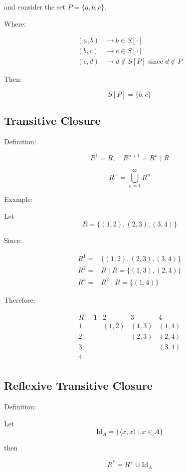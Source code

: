\documentclass[12pt,a4paper,openany]{article}
\begin{document}
and consider the set $P = \{a,b,c\}$.

Where:

$$\begin{aligned}
   (a,b) &\to b \in S[\cdot]\\
    (b,c) &\to c \in S[\cdot]\\
    (c,d) &\to d \notin S[P] \text{ since } d \notin P
\end{aligned}
$$  

Then:

$$
S[P] = \{b,c\}
$$

\subsection{Transitive Closure}

Definition:

$$
R^1 = R, \quad R^{n+1} = R^n \mid R
$$

$$
R^+ = \displaystyle\bigcup_{n=1}^{\infty} R^n
$$

Example:

Let $$R = \{ (1,2), (2,3), (3,4) \}$$ 

Since:

$$\begin{aligned}
R^1 =& \{ (1,2), (2,3), (3,4) \} \\
R^2 =& R \mid R = \{ (1,3), (2,4) \} \\
R^3 =& R^2 \mid R = \{ (1,4) \}
\end{aligned}$$

Therefore:

$$
\begin{array}{c|cccc}
R^+ & 1 & 2 & 3 & 4 \\
\hline
1 & & (1,2) & (1,3) & (1,4) \\
2 & & & (2,3) & (2,4) \\
3 & & & & (3,4) \\
4 & & & & \\
\end{array}
$$

\subsection{Reflexive Transitive Closure}

Definition:

Let $$\text{Id}_A = \{ \langle x, x \rangle \mid x \in A \}$$

then

$$
R^* = R^+ \cup \text{Id}_A
$$
\end{document}
